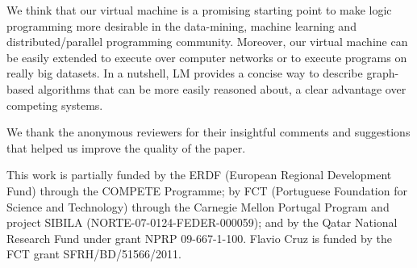 \documentclass{sigplanconf}
\begin{document}
We think that our virtual machine is a promising starting point to make
logic programming more desirable in the data-mining, machine learning and
distributed/parallel programming community. Moreover, our virtual machine can
be easily extended to execute over computer networks or to execute programs on really big datasets.
In a nutshell, LM provides a concise way to describe
graph-based algorithms that can be more easily reasoned about, a clear advantage over
competing systems.
 
\makeatletter{}\acks

We thank the anonymous reviewers for their insightful comments and suggestions
that helped us improve the quality of the paper.

This work is partially funded by the ERDF (European Regional
Development Fund) through the COMPETE Programme; by FCT (Portuguese
Foundation for Science and Technology) through the Carnegie Mellon
Portugal Program and project SIBILA (NORTE-07-0124-FEDER-000059); and
by the Qatar National Research Fund under grant NPRP
09-667-1-100. Flavio Cruz is funded by the FCT grant
SFRH/BD/51566/2011.
 

\balance



\end{document}
